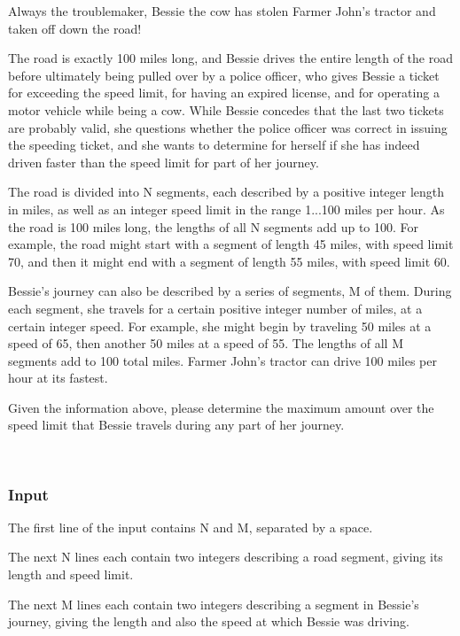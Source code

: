

Always the troublemaker, Bessie the cow has stolen Farmer John's tractor and taken off down the road! 

The road is exactly 100 miles long, and Bessie drives the entire length of the road before ultimately being pulled over by a police officer, who gives Bessie a ticket for exceeding the speed limit, for having an expired license, and for operating a motor vehicle while being a cow.  While Bessie concedes that the last two tickets are probably valid, she questions whether the police officer was correct in issuing the speeding ticket, and she wants to determine for herself if she has indeed driven faster than the speed limit for part of her journey.

The road is divided into N segments, each described by a positive integer length in miles, as well as an integer speed limit in the range 1...100 miles per hour.  As the road is 100 miles long, the lengths of all N segments add up to 100.  For example, the road might start with a segment of length 45 miles, with speed limit 70, and then it might end with a segment of length 55 miles, with speed limit 60.

Bessie's journey can also be described by a series of segments, M of them.  During each segment, she travels for a certain positive integer number of miles, at a certain integer speed.  For example, she might begin by traveling 50 miles at a speed of 65, then another 50 miles at a speed of 55.  The lengths of all M segments add to 100 total miles.  Farmer John's tractor can drive 100 miles per hour at its fastest.

Given the information above, please determine the maximum amount over the speed limit that Bessie travels during any part of her journey.

 

\subsubsection{Input}

The first line of the input contains N and M, separated by a space. 

The next N lines each contain two integers describing a road segment, giving its length and speed limit.

The next M lines each contain two integers describing a segment in Bessie's journey, giving the length and also the speed at which Bessie was driving.

 

